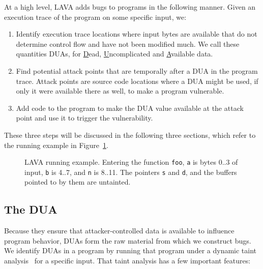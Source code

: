 

At a high level, LAVA adds bugs to programs in the following manner. Given an execution trace of the program on some specific input, we:

\begin {enumerate}
\item Identify execution trace locations where input bytes are available that do not determine control flow and have not been modified much. 
We call these quantities DUAs, for \underline{D}ead, \underline{U}ncomplicated and \underline{A}vailable data.
\item Find potential attack points that are temporally after a DUA in the program trace.
Attack points are source code locations where a DUA might be used, if only it were available there as well, to make a program vulnerable. 
\item Add code to the program to make the DUA value available at the attack point and use it to trigger the vulnerability. 
\end{enumerate}

These three steps will be discussed in the following three sections, which refer to the running example in Figure~\ref{fig:worked-example}.

\begin{figure}

\caption{LAVA running example.  
Entering the function \texttt{foo}, \texttt{a} is bytes 0..3 of input, \texttt{b} is 4..7, and \texttt{n} is 8..11.
The pointers \texttt{s} and \texttt{d}, and the buffers pointed to by them are untainted.}
\label{fig:worked-example}
\end{figure}

\subsection {The DUA}

Because they ensure that attacker-controlled data is available to influence program behavior, DUAs form the raw material from which we construct bugs. 
We identify DUAs in a program by running that program under a dynamic taint analysis~\cite{newsometaint} for a specific input.
That taint analysis has a few important features:

